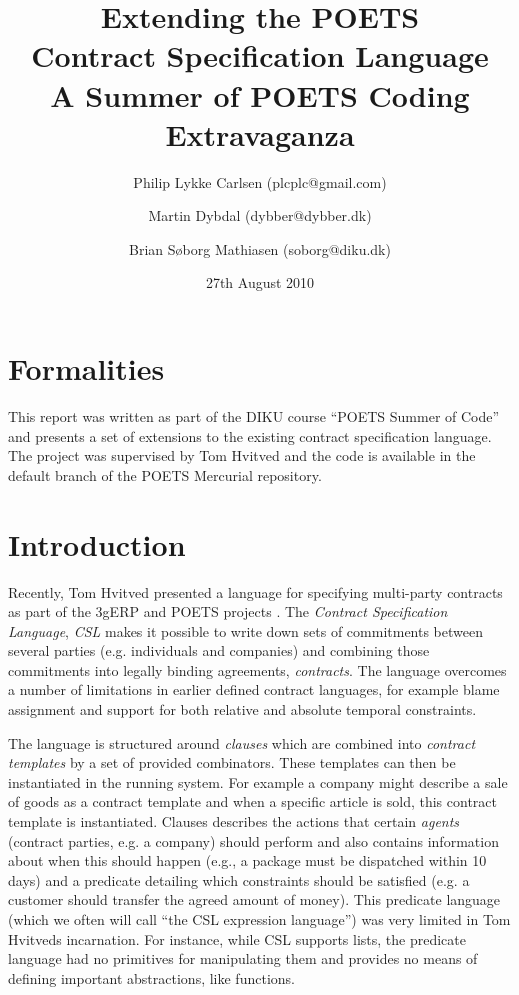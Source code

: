 \documentclass[10pt,a4paper,final,oneside,openany,article]{memoir}
\title{Extending the POETS \\ Contract Specification Language\\
       \vspace{0.1cm}
        \small{A Summer of POETS Coding Extravaganza}}
\author{Philip Lykke Carlsen (plcplc@gmail.com) \and
        Martin Dybdal (dybber@dybber.dk) \and
        Brian Søborg Mathiasen (soborg@diku.dk)}
\date{27th August 2010}
\begin{document}
\listoffixmes
\newpage
\maketitle



\chapter{Formalities}
This report was written as part of the DIKU course ``POETS Summer of
Code'' and presents a set of extensions to the existing contract
specification language. The project was supervised by Tom Hvitved and
the code is available in the default branch of the POETS Mercurial
repository.

\chapter{Introduction}
Recently, Tom Hvitved presented a language for specifying multi-party
contracts \cite{hvitved10} as part of the 3gERP and POETS projects
\cite{3gerp}. The \textit{Contract Specification Language},
\textit{CSL} makes it possible to write down sets of commitments
between several parties (e.g. individuals and companies) and combining
those commitments into legally binding agreements,
\textit{contracts}. The language overcomes a number of limitations in
earlier defined contract languages, for example blame assignment and
support for both relative and absolute temporal constraints.

The language is structured around \textit{clauses} which are combined
into \textit{contract templates} by a set of provided
combinators. These templates can then be instantiated in the running
system. For example a company might describe a sale of goods as a
contract template and when a specific article is sold, this contract
template is instantiated. Clauses describes the actions that certain
\textit{agents} (contract parties, e.g. a company) should perform and
also contains information about when this should happen (e.g., a
package must be dispatched within 10 days) and a predicate detailing
which constraints should be satisfied (e.g. a customer should transfer
the agreed amount of money). This predicate language (which we often
will call ``the CSL expression language'') was very limited in Tom
Hvitveds incarnation. For instance, while CSL supports lists, the
predicate language had no primitives for manipulating them and
provides no means of defining important abstractions, like functions.
\end{document}

